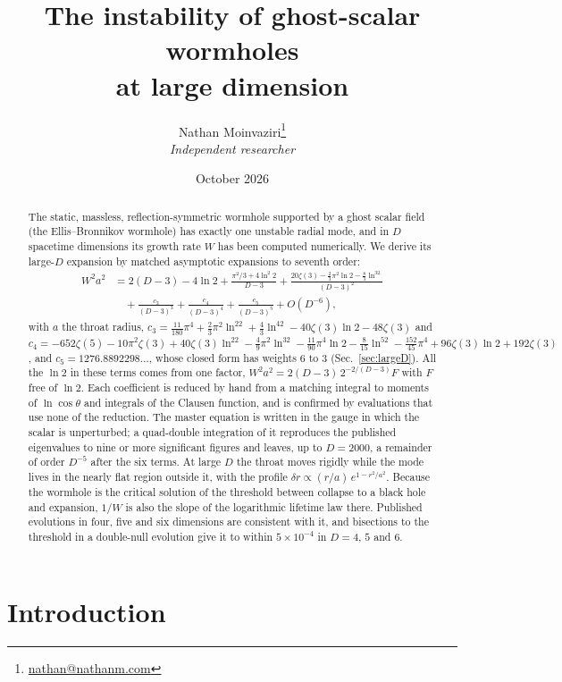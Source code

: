 \documentclass[11pt]{article}
\title{The instability of ghost-scalar wormholes\\at large dimension}
\author{Nathan Moinvaziri\thanks{\href{mailto:nathan@nathanm.com}{nathan@nathanm.com}}\\[2pt]
\normalsize\textit{Independent researcher}}
\date{October 2026}
\theoremstyle{remark}
\begin{document}
\maketitle

\begin{abstract}
The static, massless, reflection-symmetric wormhole supported by a ghost scalar field (the Ellis--Bronnikov
wormhole) has exactly one unstable radial mode, and in $D$ spacetime dimensions its growth rate $W$ has been computed
numerically. We derive its large-$D$ expansion by matched asymptotic expansions to seventh order:
\[
\begin{aligned}
W^2a^2 &= 2(D-3) - 4\ln 2 + \frac{\pi^2/3+4\ln^2 2}{D-3} + \frac{20\zeta(3)-\frac23\pi^2\ln2-\frac83\ln^32}{(D-3)^2}\\
&\quad+ \frac{c_3}{(D-3)^3} + \frac{c_4}{(D-3)^4} + \frac{c_5}{(D-3)^5} + O(D^{-6}),
\end{aligned}
\]
with $a$ the throat radius, $c_3=\frac{11}{180}\pi^4+\frac23\pi^2\ln^22+\frac43\ln^42-40\zeta(3)\ln2-48\zeta(3)$ and
$c_4=-652\zeta(5)-10\pi^2\zeta(3)+40\zeta(3)\ln^22-\frac49\pi^2\ln^32-\frac{11}{90}\pi^4\ln2-\frac{8}{15}\ln^52-\frac{152}{45}\pi^4+96\zeta(3)\ln2+192\zeta(3)$, and $c_5=1276.8892298\ldots$, whose closed form has weights 6 to 3
(Sec.~\ref{sec:largeD}). All the $\ln2$ in these terms comes from one factor, $W^2a^2=2(D-3)\,2^{-2/(D-3)}F$ with $F$ free of $\ln2$. Each
coefficient is reduced by hand from a matching integral to moments of $\ln\cos\theta$ and integrals of the Clausen
function, and is confirmed by evaluations that use none of the reduction. The master equation is written in the gauge in
which the scalar is unperturbed; a quad-double integration of it reproduces the published eigenvalues to nine or more
significant figures and leaves, up to $D=2000$, a remainder of order $D^{-5}$ after the six terms. At large $D$ the throat moves
rigidly while the mode lives in the nearly flat region outside it, with the profile
$\delta r\propto (r/a)\,e^{1-r^2/a^2}$. Because the wormhole is the critical solution of the threshold between collapse
to a black hole and expansion, $1/W$ is also the slope of the logarithmic lifetime law there. Published
evolutions in four, five and six dimensions are consistent with it, and bisections to the threshold in a double-null
evolution give it to within $5\times10^{-4}$ in $D=4$, $5$ and $6$.
\end{abstract}

\tableofcontents

\section{Introduction}
\end{document}
